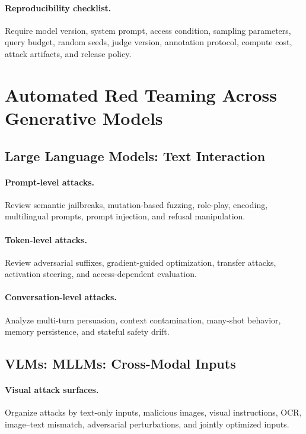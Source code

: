 \documentclass[review]{fcs}
\begin{document}
\paragraph{Reproducibility checklist.}
Require model version, system prompt, access condition, sampling parameters, query budget, random seeds, judge version, annotation protocol, compute cost, attack artifacts, and release policy.

\section{Automated Red Teaming Across Generative Models}
\label{sec:targets}

\subsection{Large Language Models: Text Interaction}

\paragraph{Prompt-level attacks.}
Review semantic jailbreaks, mutation-based fuzzing, role-play, encoding, multilingual prompts, prompt injection, and refusal manipulation.

\paragraph{Token-level attacks.}
Review adversarial suffixes, gradient-guided optimization, transfer attacks, activation steering, and access-dependent evaluation.

\paragraph{Conversation-level attacks.}
Analyze multi-turn persuasion, context contamination, many-shot behavior, memory persistence, and stateful safety drift.

\subsection{VLMs: MLLMs: Cross-Modal Inputs}

\paragraph{Visual attack surfaces.}
Organize attacks by text-only inputs, malicious images, visual instructions, OCR, image--text mismatch, adversarial perturbations, and jointly optimized inputs.
\end{document}
